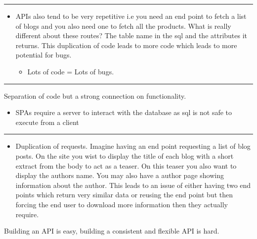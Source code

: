 \documentclass[
  12pt,
]{article}
\providecommand{\tightlist}{%
  \setlength{\itemsep}{0pt}\setlength{\parskip}{0pt}}
\begin{document}
\begin{center}\rule{0.5\linewidth}{\linethickness}\end{center}

\begin{itemize}
\tightlist
\item
  APIs also tend to be very repetitive i.e you need an end point to
  fetch a list of blogs and you also need one to fetch all the products.
  What is really different about these routes? The table name in the sql
  and the attributes it returns. This duplication of code leads to more
  code which leads to more potential for bugs.

  \begin{itemize}
  \tightlist
  \item
    Lots of code = Lots of bugs.
  \end{itemize}
\end{itemize}

\begin{center}\rule{0.5\linewidth}{\linethickness}\end{center}

Separation of code but a strong connection on functionality.

\begin{itemize}
\tightlist
\item
  SPAs require a server to interact with the database as sql is not safe
  to execute from a client
\end{itemize}

\begin{center}\rule{0.5\linewidth}{\linethickness}\end{center}

\begin{itemize}
\tightlist
\item
  Duplication of requests. Imagine having an end point requesting a list
  of blog posts. On the site you wist to display the title of each blog
  with a short extract from the body to act as a teaser. On this teaser
  you also want to display the authors name. You may also have a author
  page showing information about the author. This leads to an issue of
  either having two end points which return very similar data or reusing
  the end point but then forcing the end user to download more
  information then they actually require.
\end{itemize}

Building an API is easy, building a consistent and flexible API is hard.
\end{document}
